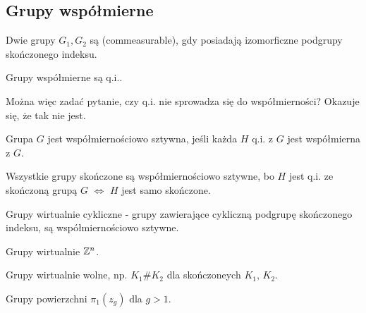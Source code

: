 \subsection{Grupy współmierne}

\begin{definition}{}{}
  Dwie grupy $G_1, G_2$ są  (commeasurable), gdy posiadają izomorficzne podgrupy skończonego indeksu.
\end{definition}

\begin{conclusion}{}{}
  Grupy współmierne są q.i..
\end{conclusion}

Można więc zadać pytanie, czy q.i. nie sprowadza się do współmierności? Okazuje się, że tak nie jest.

\begin{definition}{}{}
  Grupa $G$ jest współmiernościowo sztywna, jeśli każda $H$ q.i. z $G$ jest współmierna z $G$.
\end{definition}

\begin{example}[m]
\item Wszystkie grupy skończone są współmiernościowo sztywne, bo $H$ jest q.i. ze skończoną grupą $G$ $\iff$ $H$ jest samo skończone.
\item Grupy wirtualnie cykliczne - grupy zawierające cykliczną podgrupę skończonego indeksu, są współmiernościowo sztywne.
\item Grupy wirtualnie $\mathbb{Z}^n$.
\item Grupy wirtualnie wolne, np. $K_1\# K_2$ dla skończoneych $K_1$, $K_2$.
\item Grupy powierzchni $\pi_1(z_g)$ dla $g>1$.
\end{example}



